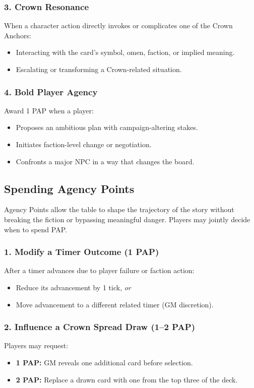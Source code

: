 \documentclass[11pt]{article}
\begin{document}
\subsubsection{3. Crown Resonance}
When a character action directly invokes or complicates one of the Crown Anchors:
\begin{itemize}
    \item Interacting with the card's symbol, omen, faction, or implied meaning.
    \item Escalating or transforming a Crown-related situation.
\end{itemize}

\subsubsection{4. Bold Player Agency}
Award 1 PAP when a player:
\begin{itemize}
    \item Proposes an ambitious plan with campaign-altering stakes.
    \item Initiates faction-level change or negotiation.
    \item Confronts a major NPC in a way that changes the board.
\end{itemize}

\subsection{Spending Agency Points}

Agency Points allow the table to shape the trajectory of the story without breaking the 
fiction or bypassing meaningful danger. Players may jointly decide when to spend PAP.

\subsubsection{1. Modify a Timer Outcome (1 PAP)}
After a timer advances due to player failure or faction action:
\begin{itemize}
    \item Reduce its advancement by 1 tick, \emph{or}
    \item Move advancement to a different related timer (GM discretion).
\end{itemize}

\subsubsection{2. Influence a Crown Spread Draw (1--2 PAP)}
Players may request:
\begin{itemize}
    \item \textbf{1 PAP:} GM reveals one additional card before selection.
    \item \textbf{2 PAP:} Replace a drawn card with one from the top three of the deck.
\end{itemize}
\end{document}
